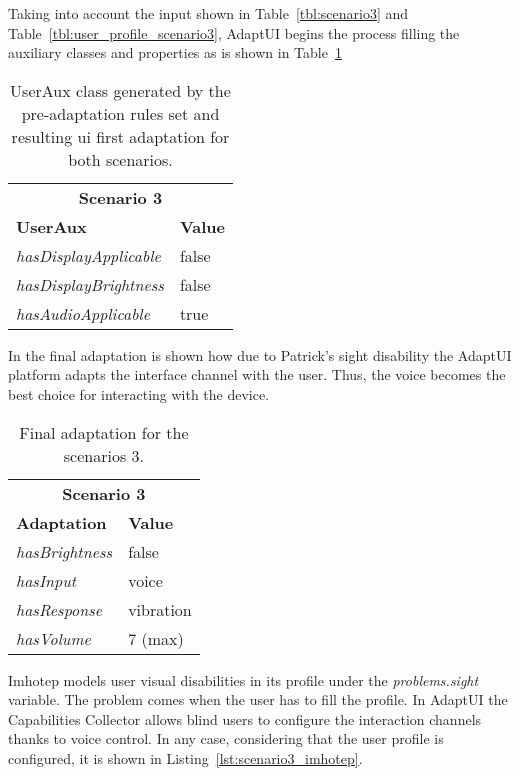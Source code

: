 Taking into account the input shown in Table~\ref{tbl:scenario3} and
Table~\ref{tbl:user_profile_scenario3}, AdaptUI begins the process filling
the auxiliary classes and properties as is shown in
Table~\ref{tbl:userAux_scenario3}


\begin{table}
 \caption{UserAux class generated by the pre-adaptation rules set and resulting
 \ac{ui} first adaptation for both scenarios.}
 \label{tbl:userAux_scenario3}
 \footnotesize
 \centering
\begin{tabular}{l l}
  \hline 
	\multicolumn{2}{c}{\textbf{Scenario 3}}	\\
	\textbf{UserAux} 	& \textbf{Value}\\
  \hline
  \textit{hasDisplayApplicable} & false		\\
  \textit{hasDisplayBrightness}	& false		\\
  \textit{hasAudioApplicable}	& true		\\
  \hline
\end{tabular}
\end{table}

In the final adaptation is shown how due to Patrick's sight disability the 
AdaptUI platform adapts the interface channel with the user. Thus, the voice
becomes the best choice for interacting with the device.

\begin{table}
 \caption{Final adaptation for the scenarios 3.}
 \label{tbl:final_adaptation_scenario3}
 \footnotesize
 \centering
\begin{tabular}{l l}
  \hline 
	\multicolumn{2}{c}{\textbf{Scenario 3}}	\\
	\textbf{Adaptation} & \textbf{Value}\\
  \hline
  \textit{hasBrightness}& false		\\
  \textit{hasInput}	& voice 	\\
  \textit{hasResponse}	& vibration	\\
  \textit{hasVolume}	& 7 (max) 	\\
  \hline
\end{tabular}
\end{table}

Imhotep models user visual disabilities in its profile under the
\textit{problems.sight} variable. The problem comes when the user has to fill 
the profile. In AdaptUI the Capabilities Collector allows blind users to 
configure the interaction channels thanks to voice control. In any case, 
considering that the user profile is configured, it is shown in 
Listing~\ref{lst:scenario3_imhotep}.

